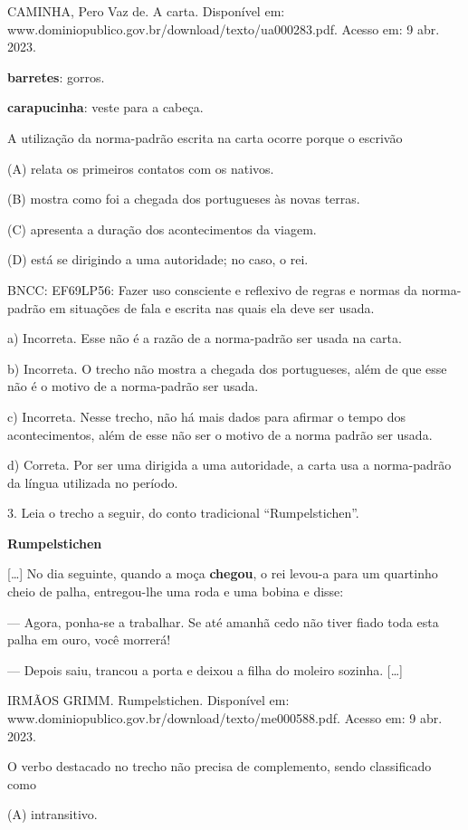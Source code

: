 \begin{itemize}
\begin{itemize}
{\begin{itemize}
\begin{itemize}
CAMINHA, Pero Vaz de. A carta. Disponível em:
www.dominiopublico.gov.br/download/texto/ua000283.pdf. Acesso em: 9 abr.
2023.

\textbf{barretes}: gorros.

\textbf{carapucinha}: veste para a cabeça.

A utilização da norma-padrão escrita na carta ocorre porque o escrivão

(A) relata os primeiros contatos com os nativos.

(B) mostra como foi a chegada dos portugueses às novas terras.

(C) apresenta a duração dos acontecimentos da viagem.

(D) está se dirigindo a uma autoridade; no caso, o rei.

BNCC: EF69LP56: Fazer uso consciente e reflexivo de regras e normas da
norma-padrão em situações de fala e escrita nas quais ela deve ser
usada.

a) Incorreta. Esse não é a razão de a norma-padrão ser usada na carta.

b) Incorreta. O trecho não mostra a chegada dos portugueses, além de que
esse não é o motivo de a norma-padrão ser usada.

c) Incorreta. Nesse trecho, não há mais dados para afirmar o tempo dos
acontecimentos, além de esse não ser o motivo de a norma padrão ser
usada.

d) Correta. Por ser uma dirigida a uma autoridade, a carta usa a
norma-padrão da língua utilizada no período.

3. Leia o trecho a seguir, do conto tradicional ``Rumpelstichen''.

\textbf{Rumpelstichen}

{[}\ldots{}{]} No dia seguinte, quando a moça \textbf{chegou}, o rei
levou-a para um quartinho cheio de palha, entregou-lhe uma roda e uma
bobina e disse:

--- Agora, ponha-se a trabalhar. Se até amanhã cedo não tiver fiado toda
esta palha em ouro, você morrerá!

--- Depois saiu, trancou a porta e deixou a filha do moleiro sozinha.
{[}\ldots{}{]}

IRMÃOS GRIMM. Rumpelstichen. Disponível em:
www.dominiopublico.gov.br/download/texto/me000588.pdf. Acesso em: 9 abr.
2023.

O verbo destacado no trecho não precisa de complemento, sendo
classificado como

(A) intransitivo.


\end{itemize}
\end{itemize}}
\end{itemize}
\end{itemize}
